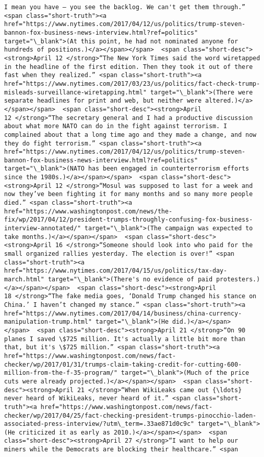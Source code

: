 \documentclass[11pt]{article}
\begin{document}
\begin{Verbatim}[commandchars=\\\{\}]
I mean you have — you see the backlog. We can't get them through.” <span class="short-truth"><a href="https://www.nytimes.com/2017/04/12/us/politics/trump-steven-bannon-fox-business-news-interview.html?ref=politics" target="\_blank">(At this point, he had not nominated anyone for hundreds of positions.)</a></span></span>  <span class="short-desc"><strong>April 12 </strong>“The New York Times said the word wiretapped in the headline of the first edition. Then they took it out of there fast when they realized.” <span class="short-truth"><a href="https://www.nytimes.com/2017/03/23/us/politics/fact-check-trump-misleads-surveillance-wiretapping.html" target="\_blank">(There were separate headlines for print and web, but neither were altered.)</a></span></span>  <span class="short-desc"><strong>April 12 </strong>“The secretary general and I had a productive discussion about what more NATO can do in the fight against terrorism. I complained about that a long time ago and they made a change, and now they do fight terrorism.” <span class="short-truth"><a href="https://www.nytimes.com/2017/04/12/us/politics/trump-steven-bannon-fox-business-news-interview.html?ref=politics" target="\_blank">(NATO has been engaged in counterterrorism efforts since the 1980s.)</a></span></span>  <span class="short-desc"><strong>April 12 </strong>“Mosul was supposed to last for a week and now they’ve been fighting it for many months and so many more people died.” <span class="short-truth"><a href="https://www.washingtonpost.com/news/the-fix/wp/2017/04/12/president-trumps-throughly-confusing-fox-business-interview-annotated/" target="\_blank">(The campaign was expected to take months.)</a></span></span>  <span class="short-desc"><strong>April 16 </strong>“Someone should look into who paid for the small organized rallies yesterday. The election is over!” <span class="short-truth"><a href="https://www.nytimes.com/2017/04/15/us/politics/tax-day-march.html" target="\_blank">(There's no evidence of paid protesters.)</a></span></span>  <span class="short-desc"><strong>April 18 </strong>“The fake media goes, ‘Donald Trump changed his stance on China.’ I haven’t changed my stance.” <span class="short-truth"><a href="https://www.nytimes.com/2017/04/14/business/china-currency-manipulation-trump.html" target="\_blank">(He did.)</a></span></span>  <span class="short-desc"><strong>April 21 </strong>“On 90 planes I saved \$725 million. It's actually a little bit more than that, but it's \$725 million.” <span class="short-truth"><a href="https://www.washingtonpost.com/news/fact-checker/wp/2017/01/31/trumps-claim-taking-credit-for-cutting-600-million-from-the-f-35-program/" target="\_blank">(Much of the price cuts were already projected.)</a></span></span>  <span class="short-desc"><strong>April 21 </strong>“When WikiLeaks came out {\ldots} never heard of WikiLeaks, never heard of it.” <span class="short-truth"><a href="https://www.washingtonpost.com/news/fact-checker/wp/2017/04/25/fact-checking-president-trumps-pinocchio-laden-associated-press-interview/?utm\_term=.33ae871d0c9c" target="\_blank">(He criticized it as early as 2010.)</a></span></span>  <span class="short-desc"><strong>April 27 </strong>“I want to help our miners while the Democrats are blocking their healthcare.” <span 
\end{Verbatim}
\end{document}
